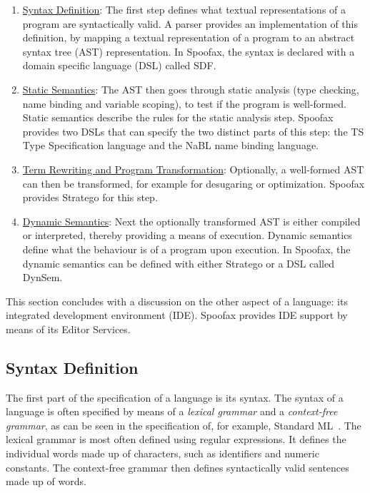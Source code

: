 \begin{enumerate}
\item \hyperref[ssec:syntax-def]{Syntax Definition}: The first step defines what textual
representations of a program are syntactically valid. A parser
provides an implementation of this definition, by mapping a textual
representation of a program to an abstract syntax tree (AST)
representation. In Spoofax, the syntax is declared with a domain
specific language (DSL) called SDF.
\item \hyperref[ssec:static-analysis]{Static Semantics}: The AST then goes through static analysis (type
checking, name binding and variable scoping), to test if the
program is well-formed. Static semantics describe the rules for the
static analysis step. Spoofax provides two DSLs that can specify the two
distinct parts of this step: the TS Type Specification language and
the NaBL name binding language.
\item \hyperref[ssec:term-rewrite]{Term Rewriting and Program Transformation}: Optionally, a
well-formed AST can then be transformed, for example for desugaring
or optimization. Spoofax provides Stratego for this step.
\item \hyperref[ssec:dynamic-semantics]{Dynamic Semantics}: Next the optionally transformed AST is either
compiled or interpreted, thereby providing a means of
execution. Dynamic semantics define what the behaviour is of a
program upon execution. In Spoofax, the dynamic semantics can be
defined with either Stratego or a DSL called DynSem.
\end{enumerate}

This section concludes with a discussion on the other
aspect of a language: its integrated development environment
(IDE). Spoofax provides IDE support by means of its Editor Services.

\subsection{Syntax Definition}
\label{ssec:a-syntax-def}
The first part of the specification of a language is its syntax. The
syntax of a language is often specified by means of a \emph{lexical
grammar} and a \emph{context-free grammar}, as can be seen in the
specification of, for example, Standard ML~\cite{Milner97}. The
lexical grammar is most often defined using regular expressions. It
defines the individual words made up of characters, such as
identifiers and numeric constants. The context-free grammar then
defines syntactically valid sentences made up of words.

